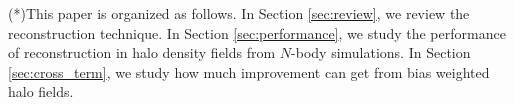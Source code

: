 
(*)This paper is organized as follows. In Section \ref{sec:review}, 
we review the
 reconstruction technique. In Section \ref{sec:performance},
  we study the performance of
  reconstruction in halo density fields from $N$-body simulations. 
 In Section \ref{sec:cross_term}, we study how much improvement can 
 get from bias weighted halo fields.\\
 
